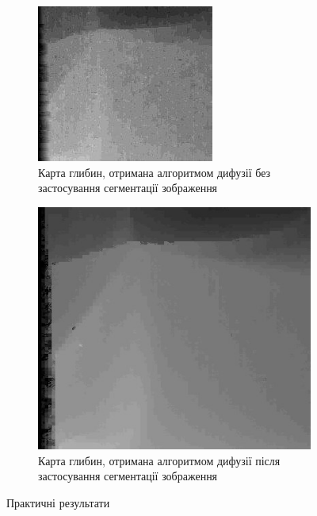 \begin{figure}[h]
  \centering
  \begin{subfigure}[b]{0.3\textwidth}
      \includegraphics[width=\textwidth]{images/pixel_based_stereo}
      \caption{Карта глибин, отримана алгоритмом дифузії без застосування сегментації зображення}
  \end{subfigure}
  \begin{subfigure}[b]{0.3\textwidth}
      \includegraphics[width=\textwidth]{images/superpixel_based_stereo}
      \caption{Карта глибин, отримана алгоритмом дифузії після застосування сегментації зображення}
  \end{subfigure}
  \caption{Практичні результати}
  \label{fig:stereo:pixel}
\end{figure}

